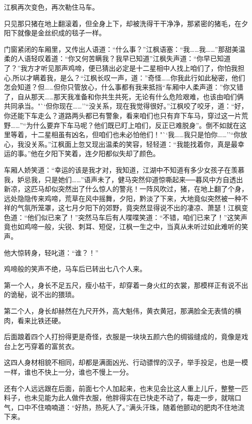 \documentclass[12pt,oneside]{book}
\begin{document}
江枫再次变色，再次勒住马车。

只见那只猪在地上翻滚着，但全身上下，却被洗得干干净净，那紧密的猪毛，在夕阳下就像是金丝织成的毯子一样。

门窗紧闭的车厢里，又传出人语道：``什么事？''江枫语塞：``我\ldots\ldots 我\ldots\ldots{}''那甜美温柔的人语轻叹着道：``你又何苦瞒我？我早已知道''江枫失声道：``你早已知道了？''我方才听见那声鸡啼，便已猜出必定是十二星相中人找上咱们了，你怕我担心,所以才瞒着我，是么？``江枫长叹一声，道：''奇怪\ldots\ldots 你我此行如此秘密，他们怎会知道？但\ldots\ldots 但你只管放心，什么事都有我来抵挡``车厢中人柔声道：''你又错了，自从那天\ldots\ldots 那天我准备和你共生共死，无论有什么危险艰难，也该由咱们俩共同承当。"``但你现在\ldots\ldots{}''``没关系，现在我觉得很好。''江枫咬了咬牙，道：``好，你还能下车走么？道路两头都已有警象，看来咱们也只有弃下车马，穿过这一片荒野\ldots\ldots{}''``为什么要弃下车马呢？他们既已盯上咱们，反正已难脱身''。倒不如就在这里等着，十二星相虽有凶名，但咱们也未必怕他们！"``我\ldots\ldots 我只是怕你\ldots\ldots{}''``你放心，我没关系。''江枫面上忽又现出温柔的笑容，轻轻道：``我能找着你，真是最幸运的事。''他在夕阳下笑着，连夕阳都似失却了颜色。

车厢人娇笑道：``幸运的该是我才对，我知道，江湖中不知道有多少女孩子在羡慕我，妒忌我，只是她们\ldots\ldots{}''语声未了，健马突然仰道惊嘶起来──暮风中方自透出新凉，这匹马却似突然出了什么惊人的警兆！一阵风吹过，猪，在地上翻了个身，远处隐隐传来鸡啼，荒草在风中摇舞，夕阳，黔淡了下来，大地竟似突然被一种不祥的气氛所笼罩，这七月夕阳下的郊野，竟突然显得说不出的凄凉、萧瑟！江枫变色道：``他们似已来了！''突然马车后有人喋喋笑道：``不错，咱们已来了！''这笑声竟也如鸡啼一般，尖锐、刺耳、短促，江枫一生之中，当真从未听过如此难听的笑声。

他大惊转身，轻叱道：``谁？！''

鸡啼般的笑声不绝，马车后已转出七八个人来。

第一个人，身长不足五尺，瘦小枯干，却穿着一身火红的衣裳，那模样正有说不出的诡秘，说不出的猥琐。

第二个人，身长却赫然在九尺开外，高大魁伟，黄衣黄冠，那满脸全无表情的横肉，看来比铁还硬。

后面踉着四个人打扮得更是奇怪，衣服是一块块五颜六色的绸锻缝成的，竟像是戏台上乞丐穿着的富贫衣。

这四人身材相貌不相同，却都是满面凶光、行动骠悍的汉子，举手投足，也是一模一样，谁也不快上一分，谁也不慢上一分。

还有个人远远跟在后面，前面七个人加起来，也末见会比这人重上儿斤，整整一匹料子，也未见能为此人做件衣服，他胖得实在已快走不动了，每走一步，就喘口气，口中不住喃喃道：``好热，热死人了。''满头汗珠，随着他颤动的肥肉不住地流下来。
\end{document}
